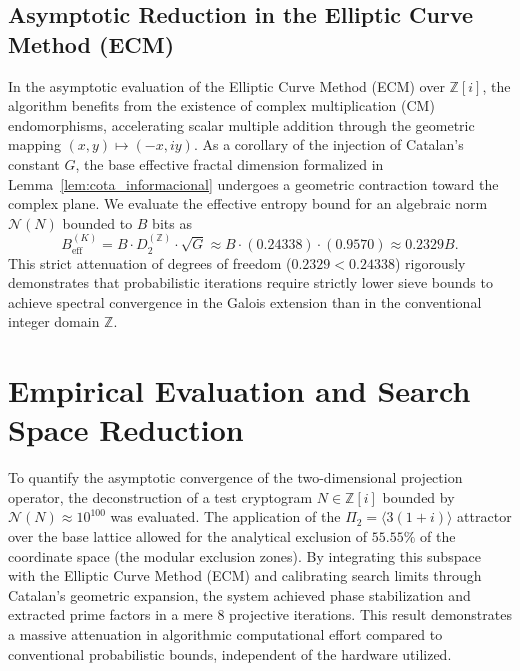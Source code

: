 \documentclass{article}
\numberwithin{equation}{section}
\theoremstyle{plain}
\theoremstyle{definition}
\begin{document}
\subsection{Asymptotic Reduction in the Elliptic Curve Method (ECM)}

In the asymptotic evaluation of the Elliptic Curve Method (ECM) over $\mathbb{Z}[i]$, the algorithm benefits from the existence of complex multiplication (CM) endomorphisms, accelerating scalar multiple addition through the geometric mapping $(x, y) \mapsto (-x, iy)$.
As a corollary of the injection of Catalan's constant $G$, the base effective fractal dimension formalized in Lemma~\ref{lem:cota_informacional} undergoes a geometric contraction toward the complex plane. We evaluate the effective entropy bound for an algebraic norm $\mathcal{N}(N)$ bounded to $B$ bits as
\begin{equation}
    B_{\text{eff}}^{(K)} = B \cdot D_2^{(\mathbb{Z})} \cdot \sqrt{G} \approx B \cdot (0.24338) \cdot (0.9570) \approx 0.2329 B \text{.}
\end{equation}
This strict attenuation of degrees of freedom ($0.2329 < 0.24338$) rigorously demonstrates that probabilistic iterations require strictly lower sieve bounds to achieve spectral convergence in the Galois extension than in the conventional integer domain $\mathbb{Z}$.

\section{Empirical Evaluation and Search Space Reduction}
\label{sec:resultados}

To quantify the asymptotic convergence of the two-dimensional projection operator, the deconstruction of a test cryptogram $N \in \mathbb{Z}[i]$ bounded by $\mathcal{N}(N) \approx 10^{100}$ was evaluated. The application of the $\Pi_2 = \langle 3(1+i) \rangle$ attractor over the base lattice allowed for the analytical exclusion of $55.55\%$ of the coordinate space (the modular exclusion zones). By integrating this subspace with the Elliptic Curve Method (ECM) and calibrating search limits through Catalan's geometric expansion, the system achieved phase stabilization and extracted prime factors in a mere $8$ projective iterations. This result demonstrates a massive attenuation in algorithmic computational effort compared to conventional probabilistic bounds, independent of the hardware utilized.
\end{document}
